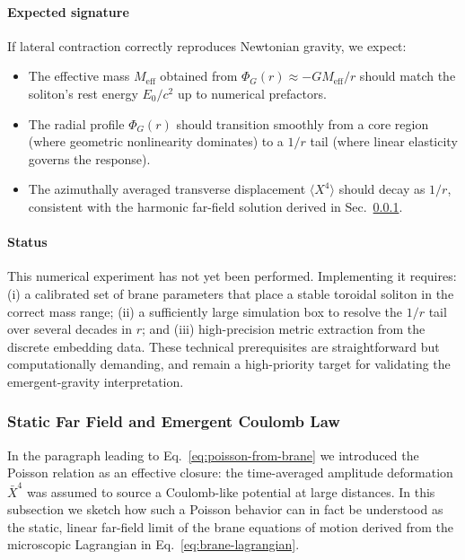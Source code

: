 \paragraph{Expected signature}

If lateral contraction correctly reproduces Newtonian gravity, we expect:
\begin{itemize}
  \item The effective mass $M_\text{eff}$ obtained from $\Phi_G(r) \approx -G M_\text{eff}/r$ should match the soliton's rest energy $E_0/c^2$ up to numerical prefactors.
  \item The radial profile $\Phi_G(r)$ should transition smoothly from a core region (where geometric nonlinearity dominates) to a $1/r$ tail (where linear elasticity governs the response).
  \item The azimuthally averaged transverse displacement $\langle X^4 \rangle$ should decay as $1/r$, consistent with the harmonic far-field solution derived in Sec.~\ref{sec:static-coulomb-from-brane}.
\end{itemize}

\paragraph{Status}

This numerical experiment has not yet been performed. Implementing it requires:
(i) a calibrated set of brane parameters that place a stable toroidal soliton in the correct mass range;
(ii) a sufficiently large simulation box to resolve the $1/r$ tail over several decades in $r$; and
(iii) high-precision metric extraction from the discrete embedding data.
These technical prerequisites are straightforward but computationally demanding, and remain a high-priority target for validating the emergent-gravity interpretation.

\subsubsection{Static Far Field and Emergent Coulomb Law}
\label{sec:static-coulomb-from-brane}

In the paragraph leading to Eq.~\eqref{eq:poisson-from-brane} we
introduced the Poisson relation as an effective closure: the
time-averaged amplitude deformation $\bar X^4$ was assumed to source a
Coulomb-like potential at large distances. In this subsection we sketch
how such a Poisson behavior can in fact be understood as the static,
linear far-field limit of the brane equations of motion derived from
the microscopic Lagrangian in Eq.~\eqref{eq:brane-lagrangian}.

